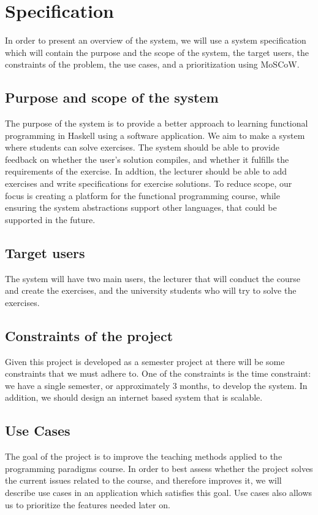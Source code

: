 \chapter{Specification}
In order to present an overview of the system, we will use a system specification which will contain the purpose and the scope of the system, the target users, the constraints of the problem, the use cases, and a prioritization using MoSCoW.

\section*{Purpose and scope of the system }
The purpose of the system is to provide a better approach to learning functional programming in Haskell using a software application.
We aim to make a system where students can solve exercises. The system should be able to provide feedback on whether the user's solution compiles, and whether it fulfills the requirements of the exercise. 
In addtion, the lecturer should be able to add exercises and write specifications for exercise solutions.
To reduce scope, our focus is creating a platform for the functional programming course, while ensuring the system abstractions support other languages, that could be supported in the future.

\section*{Target users}
The system will have two main users, the lecturer that will conduct the course and create the exercises, and the university students who will try to solve the exercises.


\section*{Constraints of the project}
Given this project is developed as a semester project at \aau{} there will be some constraints that we must adhere to. 
One of the constraints is the time constraint: we have a single semester, or approximately 3 months, to develop the system. 
In addition, we should design an internet based system that is scalable. 
 
\section*{Use Cases}
The goal of the project is to improve the teaching methods applied to the programming paradigms course. 
In order to best assess whether the project solves the current issues related to the course, and therefore improves it, we will describe use cases in an application which satisfies this goal.
Use cases also allows us to prioritize the features needed later on.


